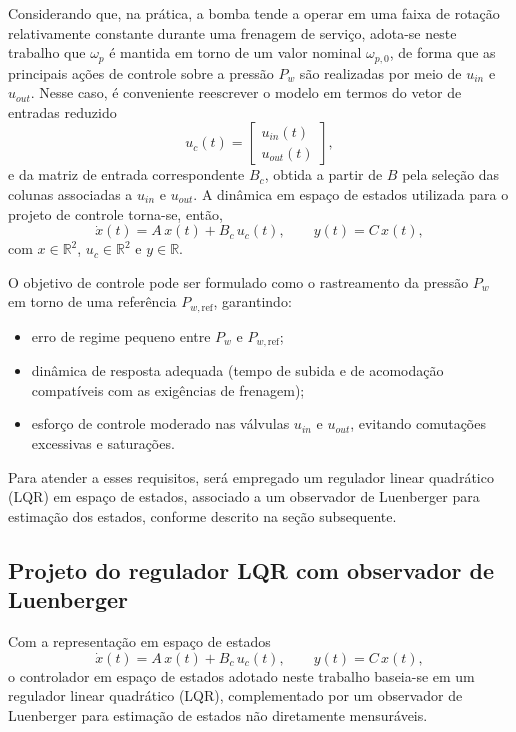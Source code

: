Considerando que, na prática, a bomba tende a operar em uma faixa de rotação relativamente constante durante uma frenagem de serviço, adota-se neste trabalho que $\omega_p$ é mantida em torno de um valor nominal $\omega_{p,0}$, de forma que as principais ações de controle sobre a pressão $P_w$ são realizadas por meio de $u_{in}$ e $u_{out}$. Nesse caso, é conveniente reescrever o modelo em termos do vetor de entradas reduzido
\[
    u_c(t) =
    \begin{bmatrix}
        u_{in}(t) \\
        u_{out}(t)
    \end{bmatrix},
\]
e da matriz de entrada correspondente $B_c$, obtida a partir de $B$ pela seleção das colunas associadas a $u_{in}$ e $u_{out}$. A dinâmica em espaço de estados utilizada para o projeto de controle torna-se, então,
\[
    \dot{x}(t) = A\,x(t) + B_c\,u_c(t), \qquad
    y(t) = C\,x(t),
\]
com $x \in \mathbb{R}^2$, $u_c \in \mathbb{R}^2$ e $y \in \mathbb{R}$.

O objetivo de controle pode ser formulado como o rastreamento da pressão $P_w$ em torno de uma referência $P_{w,\text{ref}}$, garantindo:
\begin{itemize}
    \item erro de regime pequeno entre $P_w$ e $P_{w,\text{ref}}$;
    \item dinâmica de resposta adequada (tempo de subida e de acomodação compatíveis com as exigências de frenagem);
    \item esforço de controle moderado nas válvulas $u_{in}$ e $u_{out}$, evitando comutações excessivas e saturações.
\end{itemize}
Para atender a esses requisitos, será empregado um regulador linear quadrático (LQR) em espaço de estados, associado a um observador de Luenberger para estimação dos estados, conforme descrito na seção subsequente.


\subsection{Projeto do regulador LQR com observador de Luenberger}
\label{sec:controle-lqr-luenberger}

Com a representação em espaço de estados
\[
    \dot{x}(t) = A\,x(t) + B_c\,u_c(t), \qquad
    y(t) = C\,x(t),
\]
o controlador em espaço de estados adotado neste trabalho baseia-se em um regulador linear quadrático (LQR), complementado por um observador de Luenberger para estimação de estados não diretamente mensuráveis.

